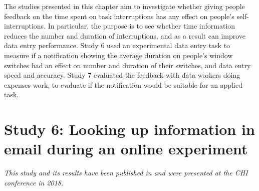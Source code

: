 The studies presented in this chapter aim to investigate whether giving people feedback on the time spent on task interruptions has any effect on people's self-interruptions. In particular, the purpose is to see whether time information reduces the number and duration of interruptions, and as a result can improve data entry performance. Study 6 used an experimental data entry task to measure if a notification showing the average duration on people's window switches had an effect on number and duration of their switches, and data entry speed and accuracy. Study 7 evaluated the feedback with data workers doing expenses work, to evaluate if the notification would be suitable for an applied task.


\section{Study 6: Looking up information in email during an online experiment}
\textit{This study and its results have been published in \citet{Borghouts2018a} and were presented at the CHI conference in 2018.}

